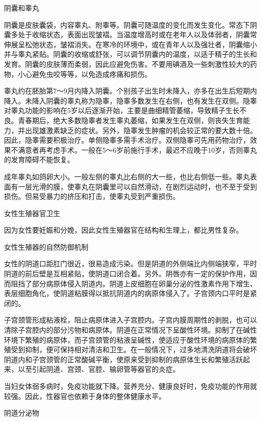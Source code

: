 \documentclass[12pt,UTF8,openany]{ctexbook}
\begin{document}
阴囊和睾丸

阴囊是皮肤囊袋，内容睾丸、附睾等。阴囊可随温度的变化而发生变化。常态下阴囊多处于收缩状态，表面出现皱褶。当温度增高时或在老年人以及体弱者，阴囊常伸展呈松弛状态，皱褶消失。在寒冷的环境中，或在青年人以及强壮者，阴囊缩小并与睾丸紧贴。阴囊的收缩或舒张，可以调节阴囊内的温度，以适于精子的生长和发育。阴囊的皮肤薄而柔弱，因此应避免伤害。不要用碘酒及一些刺激性较大的药物，小心避免虫咬等等，以免造成疼痛和损伤。

睾丸约在胚胎第7～9月内降入阴囊。个别孩子出生时未降入，亦多在出生后短期内降入。未降入阴囊的睾丸称为隐睾，隐睾多数发生在右侧，也有发生在双侧。隐睾对睾丸功能的影响在5岁以后逐渐开始，主要是曲细精管萎缩，导致精子生长不良。青春期后，绝大多数隐睾者发生睾丸萎缩，如果发生在双侧，则丧失生育能力，并出现雄激素缺乏的症状。另外，隐睾发生肿瘤的机会较正常的要大数十倍。因此，隐睾需要积极治疗。单侧隐睾多需手术治疗。双侧隐睾可先用药物治疗，效果不满意者再考虑手术。一般在5～6岁前施行手术，最迟不应晚于10岁，否则睾丸的发育障碍不能恢复。

成年睾丸如鸽卵大小。一般左侧的睾丸比右侧的大一些，也比右侧低一些。睾丸表面有一层光滑的膜，使睾丸在阴囊里可以自然滑动，在剧烈运动时，也不至于受到损伤。但易受暴力的挤压和打击，使睾丸受到严重损伤。





女性生殖器官卫生


因为女性要妊娠和分娩，因此女性生殖器官在结构和生理上，都比男性复杂。

女性生殖器的自然防御机制

女性的阴道口距肛门很近，很易造成污染。但是阴道的外侧端比内侧端狭窄，平时阴道的前后壁是互相紧贴，使阴道口闭合着。另外。阴唇亦有一定的保护作用，因而阻挡了部分病原体侵入阴道内。阴道上皮细胞在卵巢分泌的性激素作用下增生、表层细胞角化，使阴道粘膜得以抵抗阴道内的病原体侵入了。子宫颈内口平时是紧闭的。

子宫颈管形成粘液栓，阻止病原体进入子宫腔内。子宫内膜周期性的剥脱，也可以清除子宫腔内的部分污物和病原体。阴道在正常情况下呈酸性环境。抑制了在碱性环境下繁殖的病原体，而子宫颈管的粘液呈碱性，使适应于酸性环境的病原体的繁殖受到抑制，便可保持相对清洁和卫生。在一般情况下，过多地清洗阴道将会破坏阴道内和子宫颈管的正常酸碱平衡，使原来受到抑制的病原体生长和繁殖活跃起来，以至引起阴道、宫颈、官腔、输卵管等器官的炎症。

当妇女体弱多病时，免疫功能就下降。营养充分、健康良好时，免疫功能的作用就较强。因此，性器官也依赖于身体的整体健康水平。

阴道分泌物
\end{document}
